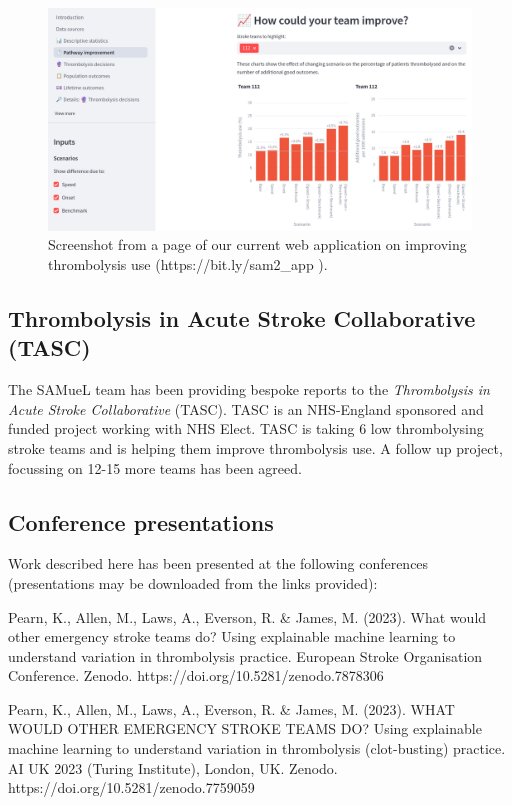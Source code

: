 \begin{figure}
    \centering
    \includegraphics[width=0.75\linewidth]{images/web_app.png}
    \caption{Screenshot from a page of our current web application on improving thrombolysis use (https://bit.ly/sam2_app ).}
    \label{fig:web_app}
\end{figure}

\subsection{Thrombolysis in Acute Stroke Collaborative (TASC)}

The SAMueL team has been providing bespoke reports to the \textit{Thrombolysis in Acute Stroke Collaborative} (TASC). TASC is an NHS-England sponsored and funded project working with NHS Elect. TASC is taking 6 low thrombolysing stroke teams and is helping them improve thrombolysis use. A follow up project, focussing on 12-15 more teams has been agreed.

\subsection{Conference presentations}

Work described here has been presented at the following conferences (presentations may be downloaded from the links provided):

Pearn, K., Allen, M., Laws, A., Everson, R. \& James, M. (2023). What would other emergency stroke teams do? Using explainable machine learning to understand variation in thrombolysis practice. European Stroke Organisation Conference. Zenodo. https://doi.org/10.5281/zenodo.7878306

Pearn, K., Allen, M., Laws, A., Everson, R. \& James, M. (2023). WHAT WOULD OTHER EMERGENCY STROKE TEAMS DO? Using explainable machine learning to understand variation in thrombolysis (clot-busting) practice. AI UK 2023 (Turing Institute), London, UK. Zenodo. https://doi.org/10.5281/zenodo.7759059

